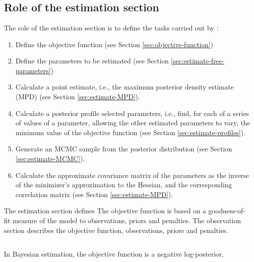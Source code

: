 \section{\label{sec:estimation-section}}

\subsection{Role of the estimation section\label{sec:role-of-the-estimation-section}}

The role of the estimation section is to define the tasks carried out by \SPM: 

\begin{enumerate}
  \item Define the objective function (see Section \ref{sec:objective-function})
  \item Define the parameters to be estimated (see Section \ref{sec:estimate-free-parameters})
  \item Calculate a point estimate, i.e., the maximum posterior density estimate (MPD) (see Section \ref{sec:estimate-MPD}).
  \item Calculate a posterior profile selected parameters, i.e., find, for each of a series of values of a parameter, allowing the other estimated parameters to vary, the minimum value of the objective function (see Section \ref{sec:estimate-profiles}).
  \item Generate an MCMC sample from the posterior distribution (see Section \ref{sec:estimate-MCMC}).
  \item Calculate the approximate covariance matrix of the parameters as the inverse of the minimizer\textquoteright{}s approximation to the Hessian, and the corresponding correlation matrix (see Section \ref{sec:estimate-MPD}).
\end{enumerate}

The estimation section defines 
The objective function is based on a goodness-of-fit measure of the model to observations, priors and penalties. The observation section describes the objective function, observations, priors and penalties. 

\subsection{\label{sec:objective-function}}

In Bayesian estimation, the objective function is a negative log-posterior,


